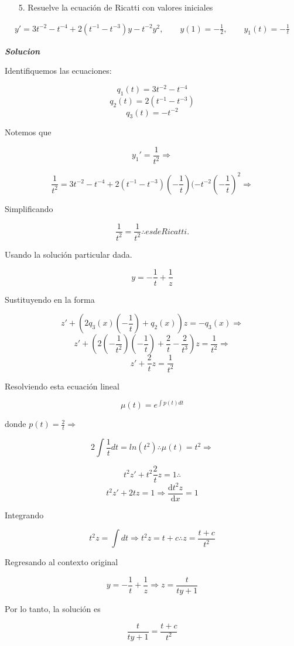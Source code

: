 \begin{enumerate}
    \item[5.] Resuelve la ecuación de Ricatti con valores iniciales
\end{enumerate}
\begin{align*}
    y' = 3t^{-2}-t^{-4}+2(t^{-1}-t^{-3})y-t^{-2}y^{2}, \qquad y(1)= - \frac{1}{2}, \qquad y_{1}(t)=-\frac{1}{t}
\end{align*}

\textit{ \textbf{Solucion}}

Identifiquemos las ecuaciones:

$$q_1(t)=3t^{-2}-t^{-4}$$
$$q_2(t)=2(t^{-1}-t^{-3})$$
$$q_3(t)=-t^{-2}$$

Notemos que

$$y_{1}'= \frac{1}{t^{2}} \Rightarrow $$  

$$\frac{1}{t^{2}}=3t^{-2}-t^{-4}+2(t^{-1}-t^{-3})(-\frac{1}{t})(-t^{-2}(-\frac{1}{t})^{2} \Rightarrow $$ 

Simplificando

$$\frac{1}{t^{2}}=\frac{1}{t^{2}} \therefore es de Ricatti. $$

Usando la solución particular dada.

$$y=-\frac{1}{t}+\frac{1}{z}$$

Sustituyendo en la forma

$$z'+(2q_3(x)(-\frac{1}{t})+q_2(x))z=-q_3(x) \Rightarrow$$
$$z'+(2(-\frac{1}{t^{2}})(-\frac{1}{t})+\frac{2}{t}-\frac{2}{t^{3}})z=\frac{1}{t^{2}} \Rightarrow$$
$$z'+\frac{2}{t}z=\frac{1}{t^{2}}$$

Resolviendo esta ecuación lineal

$$\mu(t)=e^{\int p(t)dt}$$

donde $p(t)=\frac{2}{t} \Rightarrow$

$$2\int \frac{1}{t}dt=ln(t^{2}) \therefore \mu(t)=t^{2} \Rightarrow$$

$$t^{2}z'+t^{2}\frac{2}{t}z=1 \therefore$$
$$t^{2}z'+2tz=1 \Rightarrow \frac{\mathrm{d} t^{2}z}{\mathrm{d} x}=1$$

Integrando

$$t^{2}z=\int dt \Rightarrow t^{2}z=t+c \therefore z=\frac{t+c}{t^{2}}$$

Regresando al contexto original

$$y=-\frac{1}{t}+\frac{1}{z} \Rightarrow z=\frac{t}{ty+1}$$

Por lo tanto, la solución es

$$\frac{t}{ty+1}=\frac{t+c}{t^{2}}$$

